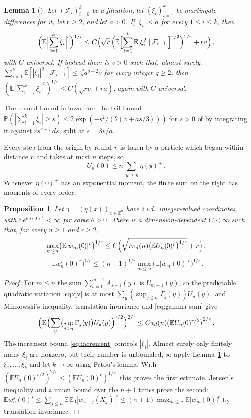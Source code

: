 \documentclass[11pt]{amsart}
\theoremstyle{plain}
\newtheorem{proposition}[theorem]{Proposition}
\newtheorem{lemma}[theorem]{Lemma}
\theoremstyle{definition}
\newcommand{\Z}{\mathbb{Z}}
\newcommand{\E}{\mathbb{E}}
\renewcommand{\P}{\mathbb{P}}
\begin{document}
\begin{lemma}[{\citealp[Theorems~4.1 and~3.3]{Pinelis}}]\label{lem:bernstein}
	Let $(\mathcal F_i)_{i=0}^k$ be a filtration, let $(\xi_i)_{i=1}^k$ be
	martingale differences for it, let $r\geq2$, and let $a>0$. If
	$|\xi_i|\leq a$ for every $1\leq i\leq k$, then
	\[
		\Bigl(\E\Bigl|\sum_{i=1}^k\xi_i\Bigr|^r\Bigr)^{1/r}\leq
		C\Bigl(\sqrt r\,\Bigl(\E\Bigl[\sum_{i=1}^k
		\E[\xi_i^2\mid\mathcal F_{i-1}]\Bigr]^{r/2}\Bigr)^{1/r}+ra\Bigr)\,,
	\]
	with $C$ universal. If instead there is $v>0$ such that, almost surely,
	$\sum_{i=1}^k\E[|\xi_i|^q\mid\mathcal F_{i-1}]\leq\tfrac{q!}{2}a^{q-2}v$
	for every integer $q\geq2$, then
	$(\E|\sum_{i=1}^k\xi_i|^r)^{1/r}\leq C(\sqrt{rv}+ra)$, again with $C$ universal.
\end{lemma}

The second bound follows from the tail bound
$\P(|\sum_{i=1}^k\xi_i|\geq s)\leq2\exp(-s^2/(2(v+as/3)))$ for $s>0$ of
\citet[Theorem~3.3]{Pinelis} by integrating it against $rs^{r-1}\,ds$, split at
$s=3v/a$.

Every step from the origin by round $n$ is taken by a particle which began within distance $n$ and takes at most $n$ steps, so
\begin{equation}\label{eq:apriori-finite}
	U_n(0)\leq n\sum_{|y|\leq n}\eta(y)^+\,.
\end{equation}
Whenever $\eta(0)^+$ has an exponential moment, the finite sum on the
right has moments of every order.

\begin{proposition}\label{prop:w-moment}
	Let $\eta=(\eta(x))_{x\in\Z^d}$ have i.i.d.\ integer-valued coordinates,
	with $\E e^{\theta\eta(0)^+}<\infty$ for some $\theta>0$. There is a
	dimension-dependent $C<\infty$ such that, for every $n\geq1$ and $r\geq2$,
	\[
		\max_{m\leq n}\bigl(\E|w_m(0)|^r\bigr)^{1/r}
		\leq C\Bigl(\sqrt{r\kappa_d(n)\bigl(\E U_n(0)^r\bigr)^{1/r}}
		+r\Bigr)\,,
	\]
	\[
		\bigl(\E w_n^\star(0)^r\bigr)^{1/r}
		\leq(n+1)^{1/r}\max_{m\leq n}\bigl(\E|w_m(0)|^r\bigr)^{1/r}\,.
	\]
\end{proposition}

\begin{proof}
	For $m\leq n$ the sum $\sum_{s=1}^{m-1}A_{s-1}(y)$ is $U_{m-1}(y)$, so the
	predictable quadratic variation \eqref{eq:qv} is at most
	$\sum_y(\sup_{j\leq n}\Gamma_j(y))U_n(y)$, and Minkowski's inequality,
	translation invariance and \eqref{eq:gamma-sum} give
	\[
		\Bigl(\E\Bigl(\sum_y\bigl(\sup_{j\leq n}\Gamma_j(y)\bigr)U_n(y)\Bigr)^{r/2}\Bigr)^{2/r}
		\leq C\kappa_d(n)\bigl(\E U_n(0)^{r/2}\bigr)^{2/r}\,.
	\]
	The increment bound
	\eqref{eq:increment} controls $|\xi_i|$. Almost surely only finitely many
	$\xi_i$ are nonzero, but their number is unbounded, so apply
	Lemma~\ref{lem:bernstein} to $\xi_1,\ldots,\xi_k$ and let $k\to\infty$ using
	Fatou's lemma. With $(\E U_n(0)^{r/2})^{2/r}\leq(\E U_n(0)^r)^{1/r}$, this
	proves the first estimate. Jensen's inequality and a union bound over the
	$n+1$ times prove the second:
	$\E w_n^\star(0)^r\leq\sum_{j\leq n}\E\,\E_0|w_{n-j}(X_j)|^r
	\leq(n+1)\max_{m\leq n}\E|w_m(0)|^r$ by translation invariance.
\end{proof}
\end{document}

